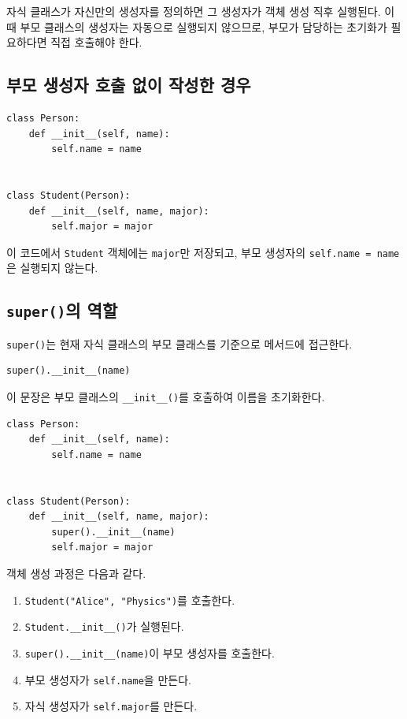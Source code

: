 \documentclass[11pt,a4paper]{article}
\begin{document}
자식 클래스가 자신만의 생성자를 정의하면 그 생성자가 객체 생성 직후 실행된다. 이때 부모 클래스의 생성자는 자동으로 실행되지 않으므로, 부모가 담당하는 초기화가 필요하다면 직접 호출해야 한다.

\subsection{부모 생성자 호출 없이 작성한 경우}

\begin{lstlisting}
class Person:
    def __init__(self, name):
        self.name = name


class Student(Person):
    def __init__(self, name, major):
        self.major = major
\end{lstlisting}

이 코드에서 \texttt{Student} 객체에는 \texttt{major}만 저장되고, 부모 생성자의 \texttt{self.name = name}은 실행되지 않는다.

\subsection{\texttt{super()}의 역할}

\texttt{super()}는 현재 자식 클래스의 부모 클래스를 기준으로 메서드에 접근한다.

\begin{lstlisting}
super().__init__(name)
\end{lstlisting}

이 문장은 부모 클래스의 \texttt{\_\_init\_\_()}를 호출하여 이름을 초기화한다.

\begin{lstlisting}
class Person:
    def __init__(self, name):
        self.name = name


class Student(Person):
    def __init__(self, name, major):
        super().__init__(name)
        self.major = major
\end{lstlisting}

객체 생성 과정은 다음과 같다.

\begin{enumerate}[leftmargin=1.8em]
    \item \texttt{Student("Alice", "Physics")}를 호출한다.
    \item \texttt{Student.\_\_init\_\_()}가 실행된다.
    \item \texttt{super().\_\_init\_\_(name)}이 부모 생성자를 호출한다.
    \item 부모 생성자가 \texttt{self.name}을 만든다.
    \item 자식 생성자가 \texttt{self.major}를 만든다.
\end{enumerate}
\end{document}

